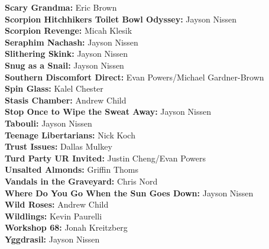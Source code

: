 \begin{flushleft}
\textbf{Scary Grandma:} Eric Brown\\
\textbf{Scorpion Hitchhikers Toilet Bowl Odyssey:} Jayson Nissen\\
\textbf{Scorpion Revenge:} Micah Klesik\\
\textbf{Seraphim Nachash:} Jayson Nissen\\
\textbf{Slithering Skink:} Jayson Nissen\\
\textbf{Snug as a Snail:} Jayson Nissen\\
\textbf{Southern Discomfort Direct:} Evan Powers/Michael Gardner-Brown\\
\textbf{Spin Glass:} Kalel Chester\\
\textbf{Stasis Chamber:} Andrew Child\\
\textbf{Stop Once to Wipe the Sweat Away:} Jayson Nissen\\
\textbf{Tabouli:} Jayson Nissen\\
\textbf{Teenage Libertarians:} Nick Koch\\
\textbf{Trust Issues:} Dallas Mulkey\\
\textbf{Turd Party UR Invited:} Justin Cheng/Evan Powers\\
\textbf{Unsalted Almonds:} Griffin Thoms\\
\textbf{Vandals in the Graveyard:} Chris Nord\\
\textbf{Where Do You Go When the Sun Goes Down:} Jayson Nissen\\
\textbf{Wild Roses:} Andrew Child\\
\textbf{Wildlings:} Kevin Paurelli\\
\textbf{Workshop 68:} Jonah Kreitzberg\\
\textbf{Yggdrasil:} Jayson Nissen\\
\end{flushleft}
\onecolumn
\clearpage